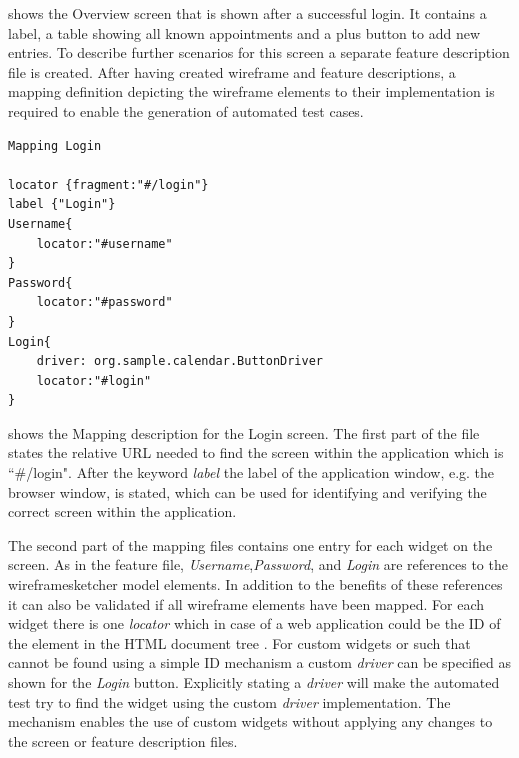 \documentclass{sig-alternate-05-2015}
\begin{document}
 shows the Overview screen that is shown after a successful login.
It contains a label, a table showing all known appointments and a plus button to add new entries.
To describe further scenarios for this screen a separate feature description file is created.
After having created wireframe and feature descriptions, a mapping definition depicting the wireframe elements to their implementation is required to enable the generation of automated test cases.

\begin{lstlisting}[captionpos=b, caption=Mapping Description: Login Screen., label={lst:mappinglogin}, language=dsl]
Mapping Login

locator {fragment:"#/login"}
label {"Login"}
Username{
	locator:"#username"
}
Password{
	locator:"#password"
}
Login{ 
    driver: org.sample.calendar.ButtonDriver
    locator:"#login"
}
\end{lstlisting}

 shows the Mapping description for the Login screen.
The first part of the file states the relative URL needed to find the screen within the application which is ``\#/login". 
After the keyword \textit{label} the label of the application window, e.g. the browser window, is stated, which can be used for identifying and verifying the correct screen within the application.

The second part of the mapping files contains one entry for each widget on the screen.
As in the feature file, \textit{Username},\textit{Password}, and \textit{Login} are references to the wireframesketcher model elements.
In addition to the benefits of these references it can also be validated if all wireframe elements have been mapped.
For each widget there is one \textit{locator} which in case of a web application could be the ID of the element in the HTML document tree \cite{w3c.dom}.
For custom widgets or such that cannot be found using a simple ID mechanism a custom \textit{driver} can be specified as shown for the \textit{Login} button.
Explicitly stating a \textit{driver} will make the automated test try to find the widget using the custom \textit{driver} implementation. 
The mechanism enables the use of custom widgets without applying any changes to the screen or feature description files.
\end{document}
